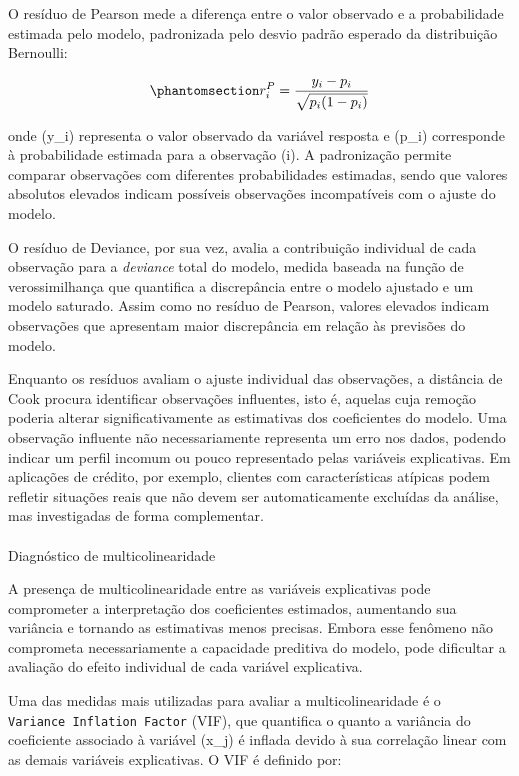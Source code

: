 \documentclass[
  brazilian,
  12pt,
  letterpaper,
  DIV=11,
  numbers=noendperiod]{scrartcl}
\makeatletter
\let\oldparagraph\paragraph
\renewcommand{\paragraph}{
    \@ifstar
      \xxxParagraphStar
      \xxxParagraphNoStar
  }
\newcommand{\xxxParagraphStar}[1]{\oldparagraph*{#1}\mbox{}}
\newcommand{\xxxParagraphNoStar}[1]{\oldparagraph{#1}\mbox{}}
\makeatother
\begin{document}
O resíduo de Pearson mede a diferença entre o valor observado e a
probabilidade estimada pelo modelo, padronizada pelo desvio padrão
esperado da distribuição Bernoulli:

\begin{equation}\protect\phantomsection\label{eq-residuo-pearson}{
r_i^P=
\frac{y_i-p_i}
{\sqrt{p_i(1-p_i)}}
}\end{equation}

onde (y\_i) representa o valor observado da variável resposta e (p\_i)
corresponde à probabilidade estimada para a observação (i). A
padronização permite comparar observações com diferentes probabilidades
estimadas, sendo que valores absolutos elevados indicam possíveis
observações incompatíveis com o ajuste do modelo.

O resíduo de Deviance, por sua vez, avalia a contribuição individual de
cada observação para a \emph{deviance} total do modelo, medida baseada
na função de verossimilhança que quantifica a discrepância entre o
modelo ajustado e um modelo saturado. Assim como no resíduo de Pearson,
valores elevados indicam observações que apresentam maior discrepância
em relação às previsões do modelo.

Enquanto os resíduos avaliam o ajuste individual das observações, a
distância de Cook procura identificar observações influentes, isto é,
aquelas cuja remoção poderia alterar significativamente as estimativas
dos coeficientes do modelo. Uma observação influente não necessariamente
representa um erro nos dados, podendo indicar um perfil incomum ou pouco
representado pelas variáveis explicativas. Em aplicações de crédito, por
exemplo, clientes com características atípicas podem refletir situações
reais que não devem ser automaticamente excluídas da análise, mas
investigadas de forma complementar.

\paragraph{Diagnóstico de
multicolinearidade}\label{diagnuxf3stico-de-multicolinearidade}

A presença de multicolinearidade entre as variáveis explicativas pode
comprometer a interpretação dos coeficientes estimados, aumentando sua
variância e tornando as estimativas menos precisas. Embora esse fenômeno
não comprometa necessariamente a capacidade preditiva do modelo, pode
dificultar a avaliação do efeito individual de cada variável
explicativa.

Uma das medidas mais utilizadas para avaliar a multicolinearidade é o
\texttt{Variance\ Inflation\ Factor} (VIF), que quantifica o quanto a
variância do coeficiente associado à variável (x\_j) é inflada devido à
sua correlação linear com as demais variáveis explicativas. O VIF é
definido por:
\end{document}

